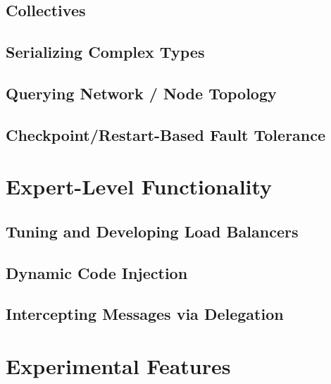 \documentclass[10pt]{report}
\begin{document}
\chapter{Collectives}
  

\chapter{Serializing Complex Types}
  

\chapter{Querying Network / Node Topology}
\label{topo}
  

\chapter{Checkpoint/Restart-Based Fault Tolerance}
\label{sec:checkpoint}
  



\part{Expert-Level Functionality}

\chapter{Tuning and Developing Load Balancers}
\label{advancedlb}
  

\chapter{Dynamic Code Injection}
\label{python}
  

\chapter{Intercepting Messages via Delegation}
\label{delegation}
  

%


\part{Experimental Features}
\end{document}
